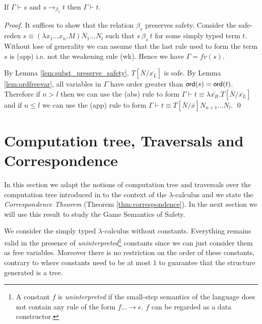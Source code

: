 \documentclass{llncs}
\newcommand\betasred{\rightarrow_{\beta_s}}
\newcommand\subst[2]{\left[ #1/#2 \right]}
\newcommand\ord[1]{{\sf ord}(#1)}
\begin{document}
\begin{lemma}
\label{lem:homoh_safered_preserve_safety}
If $\Gamma \vdash s$ and $s \betasred t$ then $\Gamma \vdash t$.
\end{lemma}

\begin{proof}
It suffices to show that the relation $\beta_s$ preserves safety.
Consider the safe-redex $ s \equiv (\lambda x_1 \ldots x_n . M) N_1 \ldots N_l $ such that
$s\ \beta_s\ t$ for some simply typed term $t$.
Without lose of generality we can assume that the last rule used to form the term $s$ is {\sf(app)} i.e. not the weakening rule
{\sf(wk)}. Hence we have $\Gamma = fv(s)$.

By Lemma \ref{lem:subst_preserve_safety}, $T\subst{\overline{N}}{\overline{x_L}}$ is safe.
By Lemma \ref{lem:ordfreevar}, all variables in $\Gamma$ have order greater than $\ord{s} = \ord{t}$. Therefore
if $n>l$ then we can use the {\sf(abs)} rule to form $\Gamma \vdash t \equiv \lambda \overline{x_R}. T\subst{\overline{N}}{\overline{x_L}}$
and if $n \leq l$ we can use the {\sf(app)} rule to form $\Gamma \vdash t \equiv  T\subst{\overline{N}}{\overline{x}} N_{n+1} \ldots N_l$.
\qed
\end{proof}


\section{Computation tree, Traversals and Correspondence}
\label{sec:correspondence}

In this section we adapt the notions of computation tree and
traversals over the computation tree introduced in \cite{OngLics2006} to the context of the $\lambda$-calculus
and we state the \emph{Correspondence Theorem} (Theorem \ref{thm:correspondence}).
In the next section we will use this result to study the Game Semantics of Safety.

We consider the simply typed $\lambda$-calculus without constants. Everything remains valid in the presence of
\emph{uninterpreted}\footnote{A constant $f$ is \emph{uninterpreted}
if the small-step semantics of the language does not contain any rule of the form $f \dots \rightarrow e$. $f$ can be regarded as a data constructor.}
constants since we can just consider them as free variables. Moreover there is no restriction on the order of these constants, contrary to \cite{OngLics2006} where constants need to be at most $1$ to guarantee that the structure generated is a tree.
\end{document}

